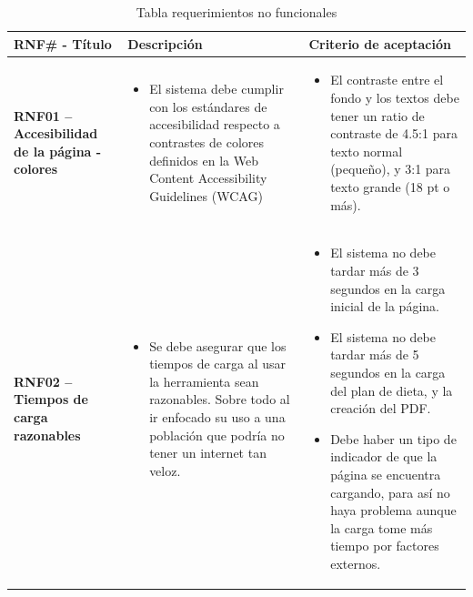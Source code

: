\begin{longtable}[c]{| p{}  | p{}  | p{}  |}
    \caption{Tabla requerimientos no funcionales}
    \label{tab:Tabla requerimientos no funcionales}
         \\ \hline \textbf{RNF\# - T\'itulo} & \textbf{Descripci\'on} & \textbf{Criterio de aceptaci\'on}  \\ \hline
         \textbf{RNF01 -- Accesibilidad de la p\'agina - colores} & \begin{itemize}
             \item El sistema debe cumplir con los est\'andares de accesibilidad respecto a contrastes de colores definidos en la Web Content Accessibility Guidelines (WCAG)
         \end{itemize} & \begin{itemize}
             \item El contraste entre el fondo y los textos debe tener un ratio de contraste de 4.5:1 para texto normal (peque\~{n}o), y 3:1 para texto grande (18 pt o m\'as).        
         \end{itemize} \\\hline
         
         \textbf{RNF02 -- Tiempos de carga razonables} & \begin{itemize}
             \item Se debe asegurar que los tiempos de carga al usar la herramienta sean razonables. Sobre todo al ir enfocado su uso a una poblaci\'on que podr\'ia no tener un internet tan veloz.
         \end{itemize}& \begin{itemize}
             \item El sistema no debe tardar m\'as de 3 segundos en la carga inicial de la p\'agina.
             \item El sistema no debe tardar m\'as de 5 segundos en la carga del plan de dieta, y la creaci\'on del PDF.
             \item Debe haber un tipo de indicador de que la p\'agina se encuentra cargando, para as\'i no haya problema aunque la carga tome m\'as tiempo por factores externos.
         \end{itemize} \\  \hline


\end{longtable}
